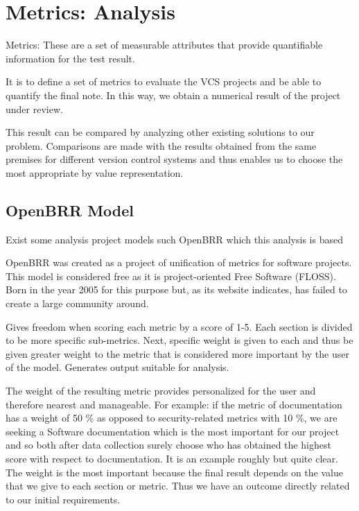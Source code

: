 \documentclass[11pt]{scrartcl}
\begin{document}
\section{Metrics: Analysis}

Metrics: These are a set of measurable attributes that provide quantifiable information for the test result.

\par It is to define a set of metrics to evaluate the VCS projects and be able to quantify the final note. In this way, we obtain a numerical result of the project under review.

\par This result can be compared by analyzing other existing solutions to our problem.
Comparisons are made with the results obtained from the same premises for different version control systems and thus enables us to choose the most appropriate by value representation.

\subsection{OpenBRR Model}

\par Exist some analysis project models such OpenBRR which this analysis is based

\par OpenBRR was created as a project of unification of metrics for software projects. This model is considered free as it is project-oriented Free Software (FLOSS). Born in the year 2005 for this purpose but, as its website indicates, has failed to create a large community around.

\par Gives freedom when scoring each metric by a score of 1-5. Each section is divided to be more specific sub-metrics. Next, specific weight is given to each and thus be given greater weight to the metric that is considered more important by the user of the model. Generates output suitable for analysis.

\par The weight of the resulting metric provides personalized for the user and therefore nearest and manageable. For example: if the metric of documentation has a weight of 50 \% as opposed to security-related metrics with 10 \%, we are seeking a Software documentation which is the most important for our project and so both after data collection surely choose who has obtained the highest score with respect to documentation. It is an example roughly but quite clear. The weight is the most important because the final result depends on the value that we give to each section or metric. Thus we have an outcome directly related to our initial requirements.
\end{document}
